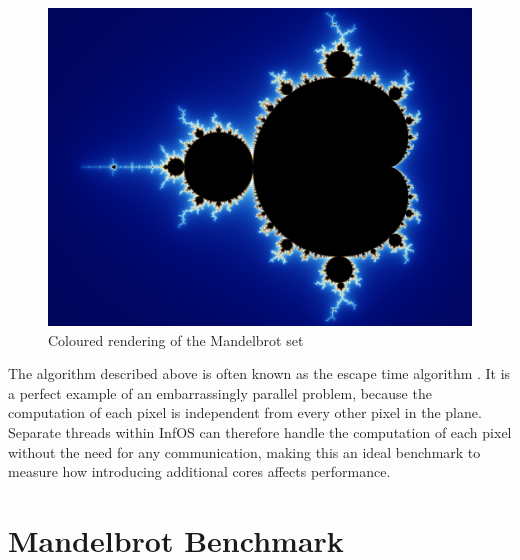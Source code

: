 \documentclass[bsc,frontabs,singlespacing,parskip,deptreport]{infthesis}
\begin{document}
\begin{figure}[h]
    \centering
    \includegraphics[scale=0.7]{mandelbrot.jpg}
    \caption{Coloured rendering of the Mandelbrot set \cite{mandelbrot-set}}
    \label{mandelbrot-vis}
\end{figure}

The algorithm described above is often known as the escape time algorithm \cite{mandelbrot-plotting-algorithms}. It is a perfect example of an embarrassingly parallel problem, because the computation of each pixel is independent from every other pixel in the plane. Separate threads within InfOS can therefore handle the computation of each pixel without the need for any communication, making this an ideal benchmark to measure how introducing additional cores affects performance.

\section{Mandelbrot Benchmark} \label{mb-benchmark}
\end{document}
